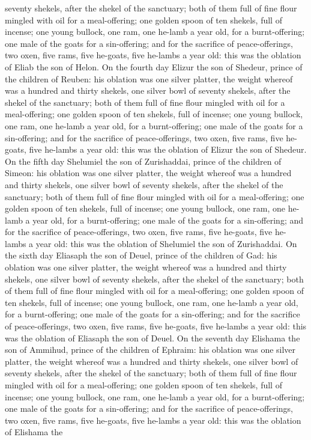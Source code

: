 seventy shekels, after the shekel of the sanctuary; both of them full of fine flour mingled with oil for a meal-offering; one golden spoon of ten shekels, full of incense; one young bullock, one ram, one he-lamb a year old, for a burnt-offering; one male of the goats for a sin-offering; and for the sacrifice of peace-offerings, two oxen, five rams, five he-goats, five he-lambs a year old: this was the oblation of Eliab the son of Helon.  On the fourth day Elizur the son of Shedeur, prince of the children of Reuben: his oblation was one silver platter, the weight whereof was a hundred and thirty shekels, one silver bowl of seventy shekels, after the shekel of the sanctuary; both of them full of fine flour mingled with oil for a meal-offering; one golden spoon of ten shekels, full of incense; one young bullock, one ram, one he-lamb a year old, for a burnt-offering; one male of the goats for a sin-offering; and for the sacrifice of peace-offerings, two oxen, five rams, five he-goats, five he-lambs a year old: this was the oblation of Elizur the son of Shedeur.  On the fifth day Shelumiel the son of Zurishaddai, prince of the children of Simeon: his oblation was one silver platter, the weight whereof was a hundred and thirty shekels, one silver bowl of seventy shekels, after the shekel of the sanctuary; both of them full of fine flour mingled with oil for a meal-offering; one golden spoon of ten shekels, full of incense; one young bullock, one ram, one he-lamb a year old, for a burnt-offering; one male of the goats for a sin-offering; and for the sacrifice of peace-offerings, two oxen, five rams, five he-goats, five he-lambs a year old: this was the oblation of Shelumiel the son of Zurishaddai.  On the sixth day Eliasaph the son of Deuel, prince of the children of Gad: his oblation was one silver platter, the weight whereof was a hundred and thirty shekels, one silver bowl of seventy shekels, after the shekel of the sanctuary; both of them full of fine flour mingled with oil for a meal-offering; one golden spoon of ten shekels, full of incense; one young bullock, one ram, one he-lamb a year old, for a burnt-offering; one male of the goats for a sin-offering; and for the sacrifice of peace-offerings, two oxen, five rams, five he-goats, five he-lambs a year old: this was the oblation of Eliasaph the son of Deuel.  On the seventh day Elishama the son of Ammihud, prince of the children of Ephraim: his oblation was one silver platter, the weight whereof was a hundred and thirty shekels, one silver bowl of seventy shekels, after the shekel of the sanctuary; both of them full of fine flour mingled with oil for a meal-offering; one golden spoon of ten shekels, full of incense; one young bullock, one ram, one he-lamb a year old, for a burnt-offering; one male of the goats for a sin-offering; and for the sacrifice of peace-offerings, two oxen, five rams, five he-goats, five he-lambs a year old: this was the oblation of Elishama the 